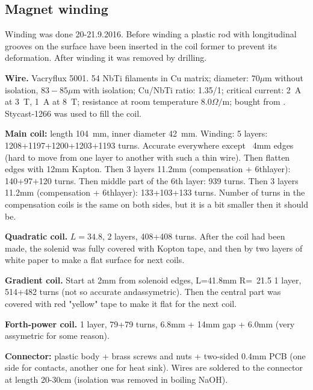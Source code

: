 \documentclass[a4paper]{article}
\begin{document}

\subsection*{Magnet winding}

Winding was done 20-21.9.2016. Before winding a plastic rod with
longitudinal grooves on the surface have been inserted in the coil former
to prevent its deformation. After winding it was removed by drilling.

{\bf Wire.} Vacryflux 5001. 54 NbTi filaments in Cu matrix; diameter:
$70\mu$m without isolation, $83-85\mu$m with isolation; Cu/NbTi ratio:
1.35/1; critical current: 2~A at 3~T, 1~A at 8~T; resistance at room
temperature $8.0\Omega/$m; bought from \Bruker. Stycast-1266 was used to
fill the coil.


{\bf Main coil:} length 104~mm, inner diameter 42~mm. Winding:
5 layers: 1208+1197+1200+1203+1193 turns. Accurate everywhere except
~4mm edges (hard to move from one layer to another with such a thin
wire). Then flatten edges with 12mm Kapton. Then 3 layers 11.2mm (compensation + 6thlayer):
140+97+120 turns. Then middle part of the 6th layer: 939 turns. Then
3 layers 11.2mm (compensation + 6thlayer): 133+103+133 turns.
Number of turns in the compensation coils is the same on both sides,
but it is a bit smaller then it should be.


{\bf Quadratic coil.} $L=34.8$, 2 layers, 408+408 turns.
After the coil had been made, the solenid was fully covered with Kopton
tape, and then by two layers of white paper to make a flat surface for
next coils.

{\bf Gradient coil.} Start at 2mm from solenoid edges, L=41.8mm R=~21.5
1 layer, 514+482 turns (not so accurate andassymetric).
Then the central part was covered with red "yellow" tape to make it flat
for the next coil.

{\bf Forth-power coil.} 1 layer, 79+79 turns, 6.8mm + 14mm gap + 6.0mm
(very assymetric for some reason).




{\bf Connector:} plastic body + brass screws and nuts +
two-sided 0.4mm PCB (one side for contacts, another one for heat sink).
Wires are soldered to the connector at length 20-30cm (isolation was
removed in boiling NaOH).
\end{document}
